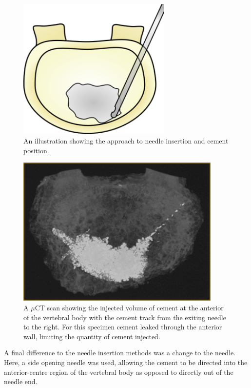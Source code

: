 \begin{figure}[h!]
  \centering
  \includegraphics[width=3in]{Chapters/Chapter_HT_images/vp_illustration.png}
  \caption{An illustration showing the approach to needle insertion and cement
position.}
  \label{fig:vp-ill}
\end{figure}


\begin{figure}[h!]
  \centering
 
\includegraphics[width=4in]{Chapters/Chapter_HT_images/vp_illustration_scan.png}
  \caption{A $\mu$CT scan showing the injected volume of cement at the anterior
of the vertebral body with the cement track from the exiting needle to the
right. For this specimen cement leaked through the anterior wall, limiting the
quantity of cement injected.}
  \label{fig:vp-ill_scan}
\end{figure}

A final difference to the needle insertion methods was a change to the needle.
Here, a side opening needle was used, allowing the cement to be directed into
the anterior-centre region of the vertebral body as opposed to directly out of
the needle end.

